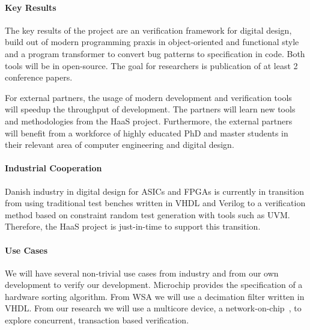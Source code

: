 \documentclass[fleqn,12pt]{article}
\begin{document}
\paragraph*{Key Results} The key results of the project are an verification framework for digital design, build
out of modern programming praxis in object-oriented and functional style and a program transformer
to convert bug patterns to specification in code. Both tools will be in open-source. The goal for researchers
is publication of at least 2 conference papers.

For external partners, the usage of modern development and verification tools will speedup the
throughput of development. The partners will learn new tools and methodologies from the HaaS project.
Furthermore, the external partners will benefit from a workforce of highly educated PhD
and master students in their relevant area of computer engineering and digital design.



\paragraph*{Industrial Cooperation}

Danish industry in digital design for ASICs and FPGAs is currently in transition from using traditional
test benches written in VHDL and Verilog to a verification method based on constraint random
test generation with tools such as UVM. Therefore, the HaaS project is just-in-time to support this
transition.

\paragraph*{Use Cases}

We will have several non-trivial use cases from industry and from our own development to verify
our development.
Microchip provides the specification of a hardware sorting algorithm.
From WSA we will use a decimation filter written in VHDL.
From our research we will use a multicore device, a network-on-chip~\cite{s4noc:nocarc2019},
to explore concurrent, transaction based verification.
\end{document}
